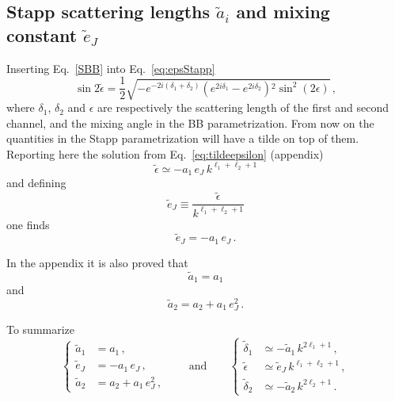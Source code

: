 \documentclass[10pt,a4paper]{article}
\newcommand{\eq}[1]{Eq.~#1}
\newcommand{\mand}{\qquad\text{and}\qquad}
\begin{document}
		\subsection{Stapp scattering lengths $\tilde{a}_i$ and mixing constant $\tilde{e}_J$}
		Inserting \eq{\eqref{SBB}} into \eq{\eqref{eq:epsStapp}} 
		\begin{equation}
			\sin2\tilde{\epsilon}
			=
			\frac{1}{2}\sqrt{- e^{-2 i \left(\delta _1+\delta _2\right)} \left(e^{2 i \delta _1}-e^{2 i \delta _2}\right){}^2 \sin ^2(2 \epsilon )}\,,
		\end{equation}
		where $\delta_1$, $\delta_2$ and $\epsilon$ are respectively the scattering length of the first and second channel, and the mixing angle in the BB parametrization. 
		From now on the quantities in the Stapp parametrization will have a tilde on top of them.
		Reporting here the solution from \eq{\eqref{eq:tildeepsilon}} (appendix)
		\begin{equation}
			\tilde{\epsilon}\simeq 
			- a_1\,e_J\,k^{\ell_1+\ell_2+1}
		\end{equation}
		and defining
		\begin{equation}
			\tilde{e}_J \equiv \frac{\tilde{\epsilon}}{k^{\ell_1+\ell_2+1}}
		\end{equation}
		one finds
		\begin{equation}
			\tilde{e}_J =
			-a_1\,e_J\,.
		\end{equation}
		
		In the appendix it is also proved that
		\begin{equation}
			\tilde{a}_1 = a_1 
		\end{equation}
		and
		\begin{equation}
			\tilde{a}_2 = a_2+a_1\,e_J^2\,.
		\end{equation}
		
		To summarize
		\begin{equation}
			\begin{cases}
				\tilde{a}_1 &= a_1\,,\\
				\tilde{e}_J &=
				-a_1\,e_J\,,\\
				\tilde{a}_2 &= a_2+a_1\,e_J^2\,,
			\end{cases}
			\mand
			\begin{cases}
				\tilde{\delta}_1 &\simeq - \tilde{a}_1\,k^{2\ell_1+1}\,,\\
				\tilde{\epsilon} &	\simeq
				\tilde{e}_J\,k^{\ell_1+\ell_2+1}\,,\\
				\tilde{\delta}_2 & \simeq -
				\tilde{a}_2\,k^{2\ell_2+1}\,.
			\end{cases}
		\end{equation}
		
\end{document}
